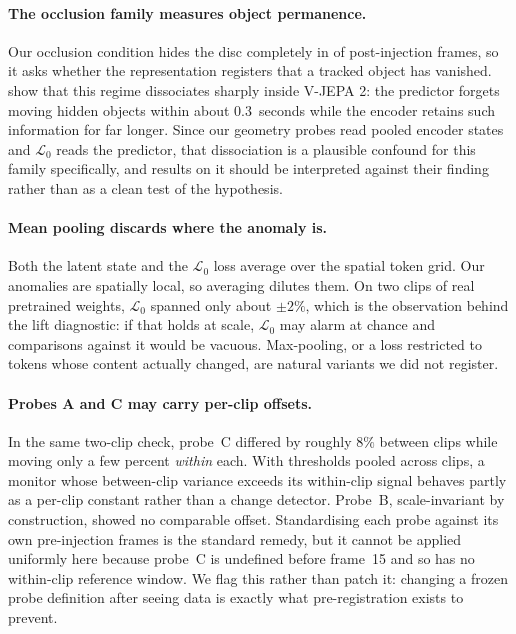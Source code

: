 \paragraph{The occlusion family measures object permanence.}
Our occlusion condition hides the disc completely in \lgwOccFullyHidden{} of
post-injection frames, so it asks whether the representation registers that a
tracked object has vanished. \citet{xie2026tracking} show that this regime
dissociates sharply inside V-JEPA 2: the predictor forgets moving hidden objects
within about $0.3$~seconds while the encoder retains such information for far
longer. Since our geometry probes read pooled encoder states and
$\mathcal{L}_0$ reads the predictor, that dissociation is a plausible confound
for this family specifically, and results on it should be interpreted against
their finding rather than as a clean test of the hypothesis.

\paragraph{Mean pooling discards where the anomaly is.}
Both the latent state and the $\mathcal{L}_0$ loss average over the spatial
token grid. Our anomalies are spatially local, so averaging dilutes them. On two
clips of real pretrained weights, $\mathcal{L}_0$ spanned only about $\pm 2\%$,
which is the observation behind the lift diagnostic: if that holds at scale,
$\mathcal{L}_0$ may alarm at chance and comparisons against it would be vacuous.
Max-pooling, or a loss restricted to tokens whose content actually changed, are
natural variants we did not register.

\paragraph{Probes A and C may carry per-clip offsets.}
In the same two-clip check, probe~C differed by roughly $8\%$ between clips
while moving only a few percent \emph{within} each. With thresholds pooled
across clips, a monitor whose between-clip variance exceeds its within-clip
signal behaves partly as a per-clip constant rather than a change detector.
Probe~B, scale-invariant by construction, showed no comparable offset.
Standardising each probe against its own pre-injection frames is the standard
remedy, but it cannot be applied uniformly here because probe~C is undefined
before frame~15 and so has no within-clip reference window. We flag this rather
than patch it: changing a frozen probe definition after seeing data is exactly
what pre-registration exists to prevent.

